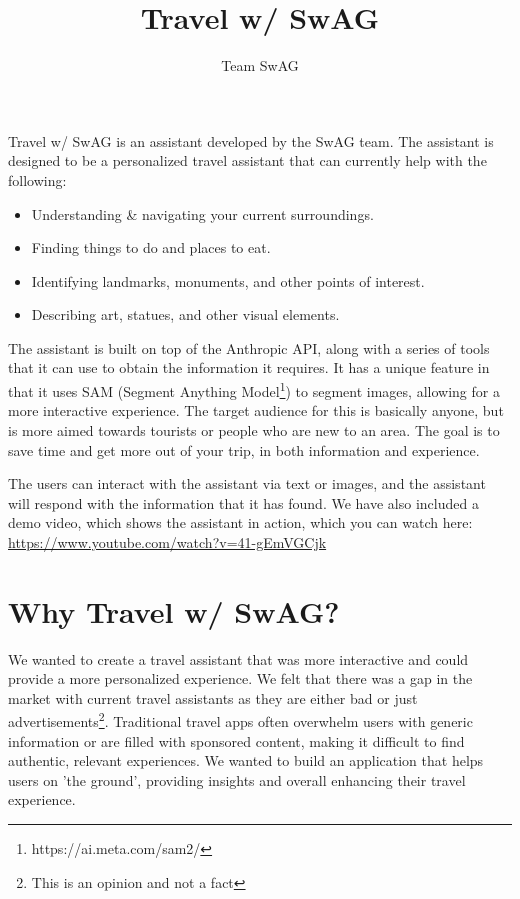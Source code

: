 \documentclass{article}
\begin{document}
\author{
    Team SwAG
}


\title{Travel w/ SwAG}
\maketitle

\begin{acronym}
\end{acronym}


Travel w/ SwAG is an assistant developed by the \ac{SwAG} team. The assistant is designed to be a personalized travel assistant that can currently help with the following:

\begin{itemize}
\item Understanding \& navigating your current surroundings.
\item Finding things to do and places to eat.
\item Identifying landmarks, monuments, and other points of interest.
\item Describing art, statues, and other visual elements.
\end{itemize}

    The assistant is built on top of the Anthropic API, along with a series of tools that it can use to obtain the information it requires. It has a unique feature in that it uses SAM (Segment Anything Model\footnote{https://ai.meta.com/sam2/}) to segment images, allowing for a more interactive experience. The target audience for this is basically anyone, but is more aimed towards tourists or people who are new to an area. The goal is to save time and get more out of your trip, in both information and experience.

The users can interact with the assistant via text or images, and the assistant will respond with the information that it has found. We have also included a demo video, which shows the assistant in action, which you can watch here: \url{https://www.youtube.com/watch?v=41-gEmVGCjk}

\section{Why Travel w/ SwAG?}

We wanted to create a travel assistant that was more interactive and could provide a more personalized experience. We felt that there was a gap in the market with current travel assistants as they are either bad or just advertisements\footnote{This is an opinion and not a fact}. Traditional travel apps often overwhelm users with generic information or are filled with sponsored content, making it difficult to find authentic, relevant experiences. We wanted to build an application that helps users on 'the ground', providing insights and overall enhancing their travel experience.
\end{document}
